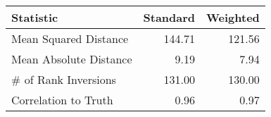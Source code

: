 \begin{tabular}{lrr}
  \hline
Statistic & Standard & Weighted \\ 
  \hline
Mean Squared Distance & 144.71 & 121.56 \\ 
  Mean Absolute Distance & 9.19 & 7.94 \\ 
  \# of Rank Inversions & 131.00 & 130.00 \\ 
  Correlation to Truth & 0.96 & 0.97 \\ 
   \hline
\end{tabular}
